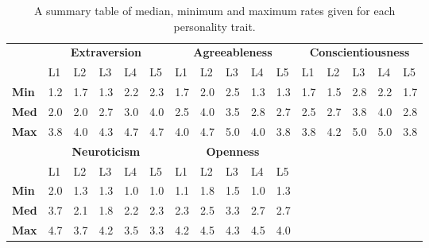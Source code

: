 \begin{table}[!htb]
    \renewcommand{\arraystretch}{1}
    \begin{center}
        \begin{tabular}{p{}|
        p{}|p{}|p{}|p{}|p{}||
        p{}|p{}|p{}|p{}|p{}||
        p{}|p{}|p{}|p{}|p{}|}
            \cline{2-16}
            & \multicolumn{5}{c||}{\textbf{Extraversion}} & \multicolumn{5}{c||}{\textbf{Agreeableness}}
            & \multicolumn{5}{c|}{\textbf{Conscientiousness}} \\
            \cline{2-16}
            & L1 & L2 & L3 & L4 & L5 & L1 & L2 & L3 & L4 & L5 & L1 & L2 & L3 & L4 & L5      \\
            \cline{2-16}
            \textbf{Min}    & 1.2 & 1.7 & 1.3 & 2.2 & 2.3 & 1.7 & 2.0 & 2.5 & 1.3 & 1.3 & 1.7 & 1.5 & 2.8 & 2.2 & 1.7  \\
            \textbf{Med}    & 2.0 & 2.0 & 2.7 & 3.0 & 4.0 & 2.5 & 4.0 & 3.5 & 2.8 & 2.7 & 2.5 & 2.7 & 3.8 & 4.0 & 2.8  \\
            \textbf{Max}    & 3.8 & 4.0 & 4.3 & 4.7 & 4.7 & 4.0 & 4.7 & 5.0 & 4.0 & 3.8 & 3.8 & 4.2 & 5.0 & 5.0 & 3.8 \\
            \cline{2-16}
            \cline{2-11}
            &  \multicolumn{5}{|c||}{\textbf{Neuroticism}} & \multicolumn{5}{|c||}{\textbf{Openness}} \\
            \cline{2-11}
            & L1 & L2 & L3 & L4 & L5 & L1 & L2 & L3 & L4 & L5            \\
            \cline{2-11}
            \textbf{Min}    & 2.0 & 1.3 & 1.3 & 1.0 & 1.0 & 1.1 & 1.8 & 1.5 & 1.0 & 1.3    \\
            \textbf{Med}    & 3.7 & 2.1 & 1.8 & 2.2 & 2.3 & 2.3 & 2.5 & 3.3 & 2.7 & 2.7    \\
            \textbf{Max}    & 4.7 & 3.7 & 4.2 & 3.5 & 3.3 & 4.2 & 4.5 & 4.3 & 4.5 & 4.0    \\
            \cline{2-11}
        \end{tabular}
        \caption[]{A summary table of median, minimum and maximum rates given for each personality trait.\footnotemark}
        \label{table:medianMM1}
    \end{center}
\end{table}

